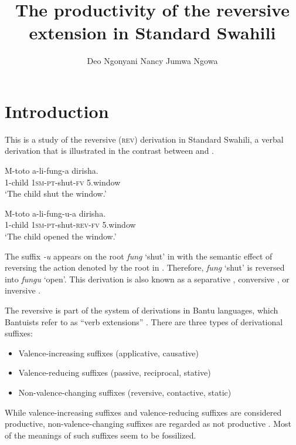 \documentclass[output=paper]{langsci/langscibook}
\title{The productivity of the reversive extension in Standard Swahili}
\author{%
 Deo Ngonyani\affiliation{Michigan State University}\lastand 
 Nancy Jumwa Ngowa \affiliation{Pwani University}
}
\begin{document}

\section{Introduction}\label{sec:ngonyaningowa:1}

This is a study of the reversive (\textsc{rev}) derivation in Standard Swahili, a verbal derivation that is illustrated in the contrast between  and .

\ea\label{ex:ngonyaningowa:1}
\ea\label{ex:ngonyaningowa:1a}  
\gll M-toto    a-li-fung-a    dirisha. \\
1-child    1\textsc{sm-pt}-shut-\textsc{fv}  5.window \\
\glt ‘The child shut the window.’

\ex\label{ex:ngonyaningowa:1b}
\gll M-toto    a-li-fung-u-a      dirisha. \\
1-child    1\textsc{sm-pt}-shut-\textsc{rev-fv}  5.window \\
\glt ‘The child opened the window.’
\z
\z

The suffix \textit{{}-u} appears on the root \textit{fung} ‘shut’ in  with the semantic effect of reversing the action denoted by the root  in . Therefore, \textit{fung} ‘shut’ is reversed into \textit{fungu} ‘open’. This derivation is also known as a separative \citep{Schadeberg2003}, conversive \citep{Ashton1947}, or inversive \citep{Doke1935}.

The reversive is part of the system of derivations in Bantu languages, which  Bantuists refer to as “verb extensions” \citep{Guthrie1962}. There are three types of derivational suffixes:

\begin{itemize}
\item Valence-increasing suffixes (applicative, causative)
\item Valence-reducing suffixes (passive, reciprocal, stative)
\item Non-valence-changing suffixes (reversive, contactive, static)
\end{itemize}

While valence-increasing suffixes and valence-reducing suffixes are considered productive, non-valence-changing suffixes are regarded as not productive \citep{Shepardson1986}. Most of the meanings of such suffixes seem to be fossilized.
\end{document}
